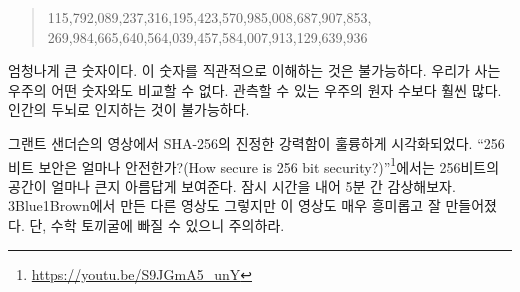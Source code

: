 \begin{comment}
	\begin{quotation}\begin{samepage}
			115 quattuorvigintillion 792 trevigintillion 89 duovigintillion 237
			unvigintillion 316 vigintillion 195 novemdecillion 423 octodecillion 570
			septendecillion 985 sexdecillion 8 quindecillion 687 quattuordecillion 907
			tredecillion 853 duodecillion 269 undecillion 984 decillion 665 nonillion
			640 octillion 564 septillion 39 sextillion 457 quintillion 584 quadrillion 7
			trillion 913 billion 129 million 639 thousand 936.
	\end{samepage}\end{quotation}
\end{comment}
\begin{quotation}
	\begin{samepage}
		115,792,089,237,316,195,423,570,985,008,687,907,853,
		269,984,665,640,564,039,457,584,007,913,129,639,936
	\end{samepage}
\end{quotation}

\begin{comment}
	That's a lot of nonillions! Wrapping your head around this number is
	pretty much impossible. There is nothing in the physical universe to
	compare it to. It is far larger than the number of atoms in the
	observable universe. The human brain simply isn't made to make sense of
	it.
\end{comment}
엄청나게 큰 숫자이다. 이 숫자를 직관적으로 이해하는 것은 불가능하다. 
우리가 사는 우주의 어떤 숫자와도 비교할 수 없다.
관측할 수 있는 우주의 원자 수보다 훨씬 많다. 
인간의 두뇌로 인지하는 것이 불가능하다.

\newpage

\begin{comment}
	One of the best visualizations of the true strength of SHA-256 is a video by
	Grant Sanderson. Aptly named \textit{\enquote{How secure is 256 bit
			security?}}\footnote{Watch the video at \url{https://youtu.be/S9JGmA5_unY}} it
	beautifully shows how large a 256-bit space is. Do yourself a favor and take the
	five minutes to watch it. As all other \textit{3Blue1Brown} videos it is not
	only fascinating but also exceptionally well made. Warning: You might fall down
	a math rabbit hole.
\end{comment}
그랜트 샌더슨의 영상에서 SHA-256의 진정한 강력함이 훌륭하게 시각화되었다.
\enquote{256비트 보안은 얼마나 안전한가?(How secure is 256 bit
	security?)}\footnote{\url{https://youtu.be/S9JGmA5_unY}}에서는
256비트의 공간이 얼마나 큰지 아름답게 보여준다. 잠시 시간을 내어 5분 간 감상해보자.
3Blue1Brown에서 만든 다른 영상도 그렇지만 이 영상도 매우 흥미롭고 잘 만들어졌다.
단, 수학 토끼굴에 빠질 수 있으니 주의하라.

